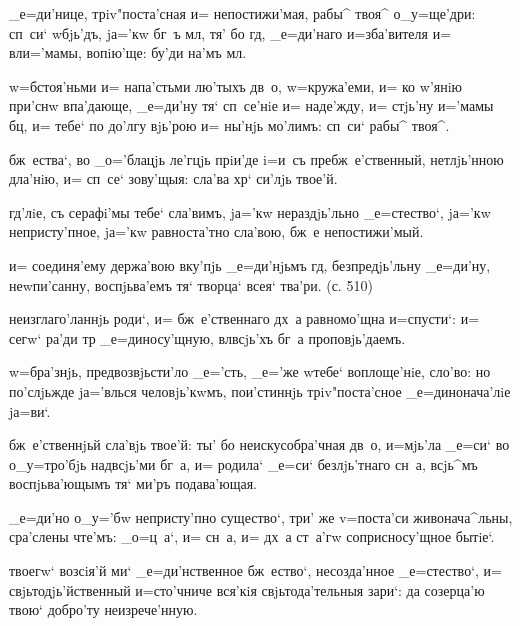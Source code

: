 _е=ди'нице, трiv"поста'сная и= непостижи'мая, рабы^ твоя^ 
о_у=ще'дри: сп~си` w\т бjь'дъ, jа='кw бг~ъ мл, тя' 
бо гд, _е=ди'наго и=зба'вителя и= вл и='мамы, 
вопiю'ще: бу'ди на'мъ мл.

w=бстоя'ньми и= напа'стьми лю'тыхъ дв~о, w=кружа'еми, и= 
ко w'янiю при'снw впа'дающе, _е=ди'ну тя` сп~се'нiе 
и= наде'жду, и= стjь'ну и='мамы бц, и= тебе` по до'лгу 
вjь'рою и= ны'нjь мо'лимъ: сп~си` рабы^ твоя^.


бж~ества`, во _о='блацjь ле'гцjь прiи'де i=и~съ 
пребж~е'ственный, нетлjь'нною дла'нiю, и= сп~се` 
зову'щыя: сла'ва хр` си'лjь твое'й.

гд'лiе, съ серафi'мы тебе` сла'вимъ, jа='кw 
нераздjь'льно _е=стество`, jа='кw непристу'пное, jа='кw 
равноста'тно сла'вою, бж~е непостижи'мый.

и= соединя'ему держа'вою вку'пjь _е=ди'нjьмъ гд, 
безпредjь'льну _е=ди'ну, неwпи'санну, воспjьва'емъ тя` 
творца` всея` тва'ри. (с. 510)

неизглаго'ланнjь роди`, и= бж~е'ственнаго дх~а 
равномо'щна и=спусти`: и= сегw` ра'ди тр 
_е=диносу'щную, вл всjь'хъ бг~а проповjь'даемъ.

w=бра'знjь, предвозвjьсти'ло _е='сть, _е='же w\т тебе` 
воплоще'нiе, сло'во: но по'слjьжде jа='влься 
человjь'кwмъ, пои'стиннjь трiv"поста'сное _е=динонача'лiе 
jа=ви`.


бж~е'ственнjьй сла'вjь твое'й: ты' бо неискусобра'чная 
дв~о, и=мjь'ла _е=си` во о_у=тро'бjь над\ъ всjь'ми бг~а, 
и= родила` _е=си` безлjь'тнаго сн~а, всjь^мъ 
воспjьва'ющымъ тя` ми'ръ подава'ющая.

_е=ди'но о_у='бw непристу'пно существо`, три' же 
v=поста'си живонача^льны, сра'слены чте'мъ: _о=ц~а`, и= 
сн~а, и= дх~а ст~а'гw соприсносу'щное бытiе`.

твоегw` возсiя'й ми` _е=ди'нственное бж~ество`, 
несозда'нное _е=стество`, и= свjьтодjь'йственный 
и=сто'чниче вся'кiя свjьтода'тельныя зари`: да созерца'ю 
твою` добро'ту неизрече'нную.

